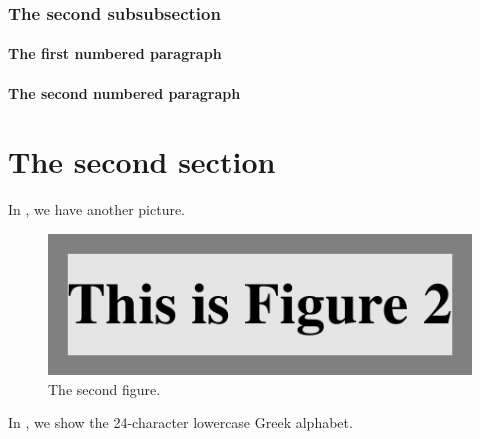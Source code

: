 \blah

\subsubsection{The second subsubsection}

\blah

\paragraph{The first numbered paragraph}

\blah

\paragraph{The second numbered paragraph}

\blah

\section{The second section}

\blah

\blah

\blah

\blah

In , we have another picture.

\blah

\begin{figure}[b]
    \centerline{\includegraphics{fig2}}
    \caption{The second figure.}%
\end{figure}

\blah

In , we show the 24-character lowercase Greek alphabet.

\blah

\blah

